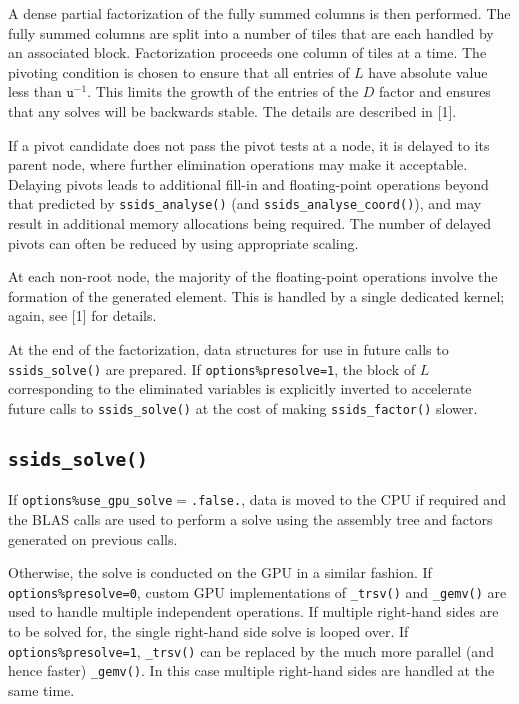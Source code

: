 A dense partial factorization of the fully summed columns is then performed. The
fully summed columns are split into a number
of tiles that are each handled by an associated  block. Factorization
proceeds one column of tiles at a time. The pivoting condition is chosen to
ensure that all entries of $L$ have absolute value less than $\texttt{u}^{-1}$.
This limits the growth of the entries of the $D$ factor and ensures that any
solves will be backwards stable. The details are described in [1].

If a pivot candidate does not pass the pivot tests at a node, it is delayed
to its parent node, where further elimination operations may make it acceptable.
Delaying pivots leads to additional fill-in and floating-point
operations beyond that predicted by {\tt ssids\_analyse()}  (and {\tt ssids\_analyse\_coord()}), 
and may result in additional memory allocations being required.
The number of delayed pivots can often be reduced by using appropriate scaling.

At each non-root node, the majority of the floating-point operations  involve the formation
of the generated element. 
This is handled by a single dedicated kernel; again, see [1] for details.

At the end of the factorization, data structures for use in future calls to
\texttt{ssids\_solve()} are prepared. If \texttt{options\%presolve=1}, the
block of $L$ corresponding to the eliminated variables is explicitly inverted
to accelerate future calls to \texttt{ssids\_solve()} at the cost of making
\texttt{ssids\_factor()} slower.

\subsection*{\texttt{ssids\_solve()}}
If \texttt{options\%use\_gpu\_solve}$=$\texttt{.false.}, data is moved to the
CPU if required and the BLAS calls are used to perform a solve using the
assembly tree and factors generated on previous calls.

Otherwise, the solve is conducted on the GPU in a similar fashion. If
\texttt{options\%presolve=0}, custom GPU implementations of \texttt{\_trsv()}
and \texttt{\_gemv()} are used to handle multiple independent operations. If
multiple right-hand sides are to be solved for, the single right-hand side solve is looped over. If \texttt{options\%presolve=1}, \texttt{\_trsv()} can be
replaced by the much more parallel (and hence faster) \texttt{\_gemv()}. In
this case multiple right-hand sides are handled at the same time.

